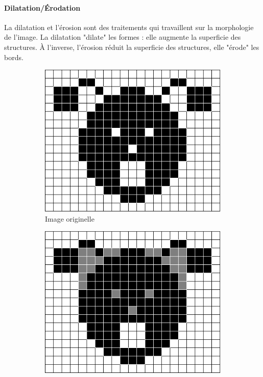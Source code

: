\documentclass[a4paper, 12pt, titlepage, oneside, french]{article}
\begin{document}
	\paragraph{\textbf{Dilatation/Érodation}}
	La dilatation et l'érosion sont des traitements qui travaillent sur la morphologie de l'image.
	La dilatation "dilate" les formes : elle augmente la superficie des structures.
	À l'inverse, l'érosion réduit la superficie des structures, elle "érode" les bords.
	\begin{figure}[H]
		\centering
		\begin{subfigure}[b]{0.3\linewidth}
			\includegraphics[width=\linewidth]{filter_dilate-erode_ex-base.png}
			\caption{Image originelle}
		\end{subfigure}
		\begin{subfigure}[b]{0.3\linewidth}
			\includegraphics[width=\linewidth]{filter_dilate-erode_ex-dilate.png}

\end{subfigure}
\end{figure}
\end{document}

